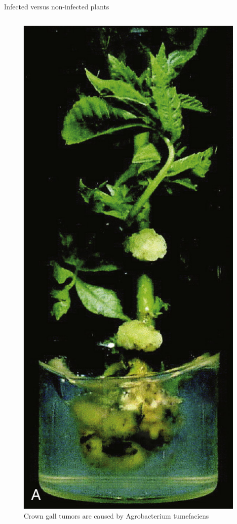 \documentclass[11pt,dvipsnames,ignorenonframetext,aspectratio=169]{beamer}
\begin{document}
\begin{frame}{Infected versus non-infected plants}
\protect\hypertarget{infected-versus-non-infected-plants}{}
\begin{columns}[T,onlytextwidth]

\begin{figure}
\includegraphics[width=0.4\linewidth]{../images/agrobacterium_gall_a} \caption{Crown gall tumors are caused by Agrobacterium tumefaciens}\label{fig:agrobacterium-gall1}
\end{figure}



\end{columns}
\end{frame}
\end{document}
